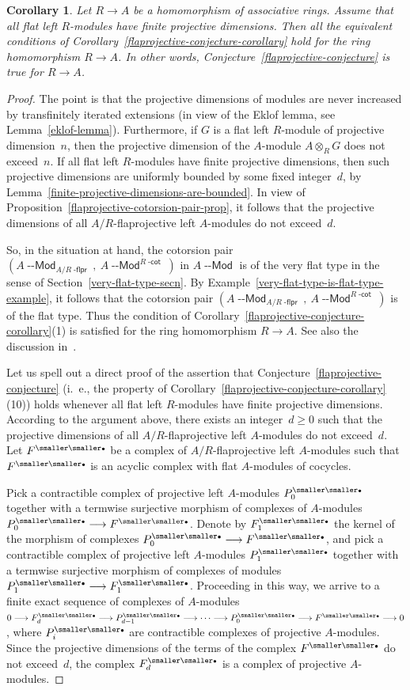\documentclass[12pt,a4paper]{amsart}
\newcommand{\+}{\nobreakdash-}
\renewcommand{\:}{\colon}
\newcommand{\rarrow}{\longrightarrow}
\newcommand{\ot}{\otimes}
\newcommand{\bu}{{\text{\smaller\smaller$\scriptstyle\bullet$}}}
\newcommand{\Modl}{{\operatorname{\mathsf{--Mod}}}}
\newcommand{\dcot}{{\operatorname{\mathsf{-cot}}}}
\newcommand{\dflpr}{{\operatorname{\mathsf{-flpr}}}}
\theoremstyle{plain}
\newtheorem{cor}[thm]{Corollary}
\theoremstyle{definition}
\begin{document}
\begin{cor}
 Let $R\rarrow A$ be a homomorphism of associative rings.
 Assume that all flat left $R$\+modules have finite projective
dimensions.
 Then all the equivalent conditions of
Corollary~\ref{flaprojective-conjecture-corollary} hold for the ring
homomorphism $R\rarrow A$.
 In other words, Conjecture~\ref{flaprojective-conjecture} is true
for $R\rarrow A$.
\end{cor}

\begin{proof}
 The point is that the projective dimensions of modules are never
increased by transfinitely iterated extensions (in view of
the Eklof lemma, see Lemma~\ref{eklof-lemma}).
 Furthermore, if $G$ is a flat left $R$\+module of projective
dimension~$n$, then the projective dimension of the $A$\+module
$A\ot_RG$ does not exceed~$n$.
 If all flat left $R$\+modules have finite projective dimensions,
then such projective dimensions are uniformly bounded by some fixed
integer~$d$, by Lemma~\ref{finite-projective-dimensions-are-bounded}.
 In view of Proposition~\ref{flaprojective-cotorsion-pair-prop},
it follows that the projective dimensions of all $A/R$\+flaprojective
left $A$\+modules do not exceed~$d$.

 So, in the situation at hand, the cotorsion pair
$(A\Modl_{A/R\dflpr},\>A\Modl^{R\dcot})$ in $A\Modl$ is of the very
flat type in the sense of Section~\ref{very-flat-type-secn}.
 By Example~\ref{very-flat-type-is-flat-type-example}, it follows
that the cotorsion pair $(A\Modl_{A/R\dflpr},\>A\Modl^{R\dcot})$ is
of the flat type.
 Thus the condition of
Corollary~\ref{flaprojective-conjecture-corollary}(1) is satisfied
for the ring homomorphism $R\rarrow A$.
 See also the discussion in~\cite[Section~8.4]{Pdomc}.

 Let us spell out a direct proof of the assertion that
Conjecture~\ref{flaprojective-conjecture} (i.~e., the property
of Corollary~\ref{flaprojective-conjecture-corollary}(10)) holds
whenever all flat left $R$\+modules have finite projective dimensions.
 According to the argument above, there exists an integer~$d\ge0$
such that the projective dimensions of all $A/R$\+flaprojective
left $A$\+modules do not exceed~$d$.
 Let $F^\bu$ be a complex of $A/R$\+flaprojective left $A$\+modules
such that $F^\bu$ is an acyclic complex with flat $A$\+modules of
cocycles.

 Pick a contractible complex of projective left $A$\+modules $P_0^\bu$
together with a termwise surjective morphism of complexes of
$A$\+modules $P_0^\bu\rarrow F^\bu$.
 Denote by $F_1^\bu$ the kernel of the morphism of complexes
$P_0^\bu\rarrow F^\bu$, and pick a contractible complex of projective
left $A$\+modules $P_1^\bu$ together with a termwise surjective
morphism of complexes of modules $P_1^\bu\rarrow F_1^\bu$.
 Proceeding in this way, we arrive to a finite exact sequence of
complexes of $A$\+modules $0\rarrow F_d^\bu\rarrow P_{d-1}^\bu
\rarrow\dotsb\rarrow P_0^\bu\rarrow F^\bu\rarrow0$, where $P_i^\bu$
are contractible complexes of projective $A$\+modules.
 Since the projective dimensions of the terms of the complex $F^\bu$
do not exceed~$d$, the complex $F_d^\bu$ is a complex of projective
$A$\+modules.


\end{proof}
\end{document}
